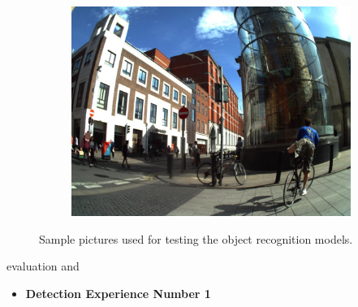 \begin{figure}[H]
\begin{subfigure}{0.3\textwidth}
  \includegraphics[width=\textwidth]{Sections/4InitialWork/4_images_obj_run4/photo.jpg}
  \end{subfigure}

  \caption{ 
  Sample pictures used for testing the object recognition models.}
  \end{figure}



  evaluation and
    
  \begin{itemize}
    \item \textbf{Detection Experience Number 1}
  \end{itemize}

    

